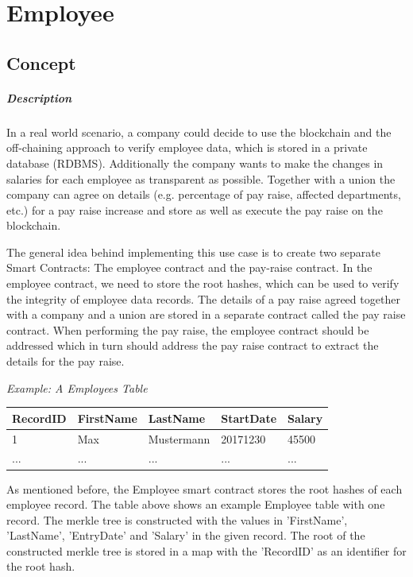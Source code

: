 \section{Employee}
\subsection{Concept}
\subparagraph{Description}
In a real world scenario, a company could decide to use the blockchain and the off-chaining approach to verify employee data, which is stored in a private database (RDBMS). Additionally the company wants to make the changes in salaries for each employee as transparent as possible. Together with a union the company can agree on details (e.g. percentage of pay raise, affected departments, etc.) for a pay raise increase and store as well as execute the pay raise on the blockchain.

The general idea behind implementing this use case is to create two separate Smart Contracts: The employee contract and the pay-raise contract. In the employee contract, we need to store the root hashes, which can be used to verify the integrity of employee data records. The details of a pay raise agreed together with a company and a union are stored in a separate contract called the pay raise contract. When performing the pay raise, the employee contract should be addressed which in turn should address the pay raise contract to extract the details for the pay raise.


\textit{Example: A Employees Table}
\begin{center}
    \begin{tabular}{| l | l | l | l | l |}
    \hline
    RecordID & FirstName & LastName & StartDate & Salary \\ \hline
    1 & Max & Mustermann & 20171230 & 45500 \\ \hline
    ... & ... & ... & ... & ... \\ \hline
    \end{tabular}
\end{center}

As mentioned before, the Employee smart contract stores the root hashes of each employee record. The table above shows an example Employee table with one record. The merkle tree is constructed with the values in 'FirstName', 'LastName', 'EntryDate' and 'Salary' in the given record. The root of the constructed merkle tree is stored in a map with the 'RecordID' as an identifier for the root hash.


